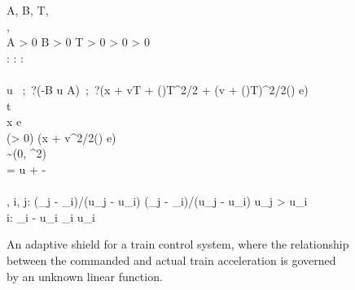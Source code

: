 \begin{figure}
  \begin{center}
  \begin{sllisting}
    \slconstant A, B, T, \sigma \\
    \slunknown \TrainThetaSlope, \TrainThetaBias \\
    \slassume
      A > 0 \commasep
      B > 0 \commasep
      T > 0 \commasep
      \sigma > 0 \commasep
      \TrainThetaSlope > 0 \\
    \slbound
      \TrainThetaSlopeMin: \TrainThetaSlopeMin \le \TrainThetaSlope \commasep
      \TrainThetaSlopeMax: \TrainThetaSlopeMax \ge \TrainThetaSlope \commasep
      \TrainThetaBiasMax: \TrainThetaBiasMax \ge \TrainThetaBias
      \\
    \slcontroller \\
      \slind u \dlassign * \ ;\, ?(-B \!\le\! u \!\le\! A) \,;\, %
      ?(x + vT + (\TrainThetaAcc)T^2/2 + (v + (\TrainThetaAcc)T)^2/2(\TrainThetaBrakingRate) \le e) \\
    \slplant t  \seq {} \\
    \slsafe x \le e \\
    \slinvariant %
      (\TrainThetaBrakingRate > 0) \land (x + v^2/2(\TrainThetaBrakingRate) \le e)  \\
    \slnoise \eta \sim \slnormal(0, \sigma^2) \\
    \slobserve \omega = \TrainThetaSlope u + \TrainThetaBias - \eta \\
    \slinfer \\
      \slind \TrainThetaSlopeMin, \TrainThetaSlopeMax \slassign \slaggregate i, j: (\omega_j - \omega_i)/(u_j - u_i) \sland (\eta_j - \eta_i)/(u_j - u_i) \slwhen u_j > u_i \seq \\
      \slind \TrainThetaBiasMax \slassign \slaggregate i: \omega_i - \TrainThetaSlopeMax u_i \sland \eta_i \slwhen u_i 
  \end{sllisting}
  \end{center}
  \caption{An adaptive shield for a train control system, where the relationship between the commanded and actual train acceleration is governed by an unknown linear function.}\label{fig:overview-train-global}
  \Description[]{}
\end{figure}


